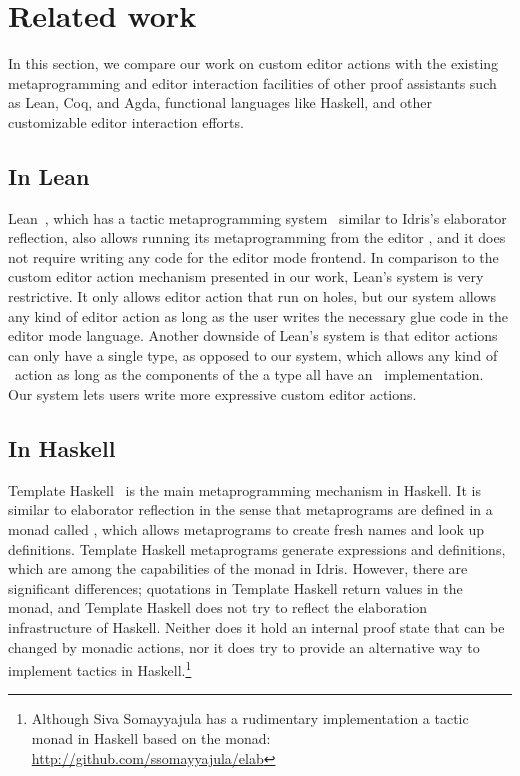 \section{Related work} \label{sec:relatedwork}

In this section, we compare our work on custom editor actions with the existing
metaprogramming and editor interaction facilities of other proof assistants
such as Lean, Coq, and Agda, functional languages like Haskell, and other
customizable editor interaction efforts.

\subsection{In Lean}

Lean~\cite{lean}, which has a tactic metaprogramming system~\cite{leanmeta}
similar to Idris's elaborator reflection, also allows running its
metaprogramming from the editor , and it does not require writing any code for
the editor mode frontend.
In comparison to the custom editor action mechanism presented in our work, Lean's
system is very restrictive. It only allows editor action that run on holes, but
our system allows any kind of editor action as long as the user writes the
necessary glue code in the editor mode language. Another downside of Lean's
system is that editor actions can only have a single type, as opposed to our
system, which allows any kind of \Elab\ action as long as the components of the
a type all have an \Editorable\ implementation. Our system lets users write
more expressive custom editor actions.

\subsection{In Haskell}

Template Haskell~\cite{th} is the main metaprogramming mechanism in Haskell.
It is similar to elaborator reflection in the sense that metaprograms are
defined in a monad called , which allows metaprograms to create fresh
names and look up definitions.
Template Haskell metaprograms generate expressions and definitions, which are
among the capabilities of the \Elab{} monad in Idris.
However, there are significant differences;
quotations in Template Haskell return values in the  monad, and Template
Haskell does not try to reflect the elaboration infrastructure of
Haskell.
Neither does it hold an internal proof state that can be changed by monadic
actions, nor it does try to provide an alternative way to implement tactics in
Haskell.\footnote{Although Siva Somayyajula has a rudimentary
implementation a tactic monad in Haskell based on the  monad:
\url{http://github.com/ssomayyajula/elab}}

